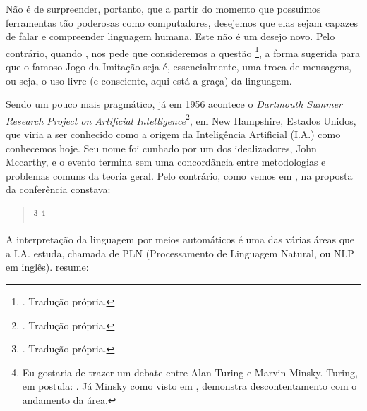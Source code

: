 Não é de surpreender, portanto, que a partir do momento que possuímos ferramentas tão poderosas como computadores, desejemos que elas sejam capazes de falar e compreender linguagem humana. Este não é um desejo novo. Pelo contrário, quando , nos pede que consideremos a questão \footnote{. Tradução própria.}, a forma sugerida para que o famoso Jogo da Imitação seja  é, essencialmente, uma troca de mensagens, ou seja, o uso livre (e consciente, aqui está a graça) da linguagem. 

Sendo um pouco mais pragmático, já em 1956 acontece o \textit{Dartmouth Summer Research Project on Artificial Intelligence}\footnote{. Tradução própria.}, em New Hampshire, Estados Unidos, que viria a ser conhecido como a origem da Inteligência Artificial (I.A.) como conhecemos hoje. Seu nome foi cunhado por um dos idealizadores, John Mccarthy, e o evento termina sem uma concordância entre metodologias e problemas comuns da teoria geral. Pelo contrário, como vemos em \cite[p~87]{Moor2006DartmouthIA}, na proposta da conferência constava:
\begin{quote}
    \footnote{. Tradução própria.}
    \footnote{Eu gostaria de trazer um debate entre Alan Turing e Marvin Minsky. Turing, em  postula: . Já Minsky como visto em \cite[p~87]{Moor2006DartmouthIA}, demonstra descontentamento com o andamento da área. }
\end{quote}

A interpretação da linguagem por meios automáticos é uma das várias áreas que a I.A. estuda, chamada de PLN (Processamento de Linguagem Natural, ou NLP em inglês). 
 resume:
\begin{quote}
\end{quote}

